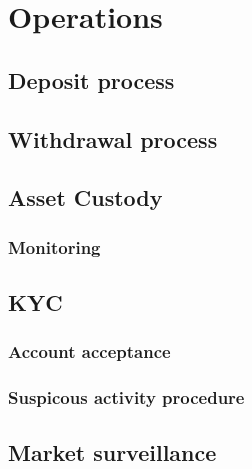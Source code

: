 \chapter{Operations}

\section{Deposit process}
\section{Withdrawal process}

\section{Asset Custody}
\subsection{Monitoring}

\section{KYC}
\subsection{Account acceptance}
\subsection{Suspicous activity procedure}
\section{Market surveillance}
